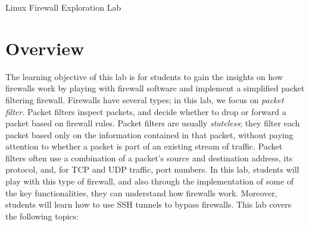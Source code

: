 



\newcommand{\telnet} {\texttt{telnet}\xspace}

\newcommand{\firewallFigs}{./Figs}





\begin{center}
{\LARGE Linux Firewall Exploration Lab}
\end{center}




\section{Overview}

The learning objective of this lab is for students to gain the 
insights on how firewalls work 
by playing with firewall software and implement a simplified 
packet filtering firewall.
Firewalls have several types; in this lab, we focus on
\textit{packet filter}.
Packet filters inspect packets, and decide 
whether to drop or forward a packet based on firewall rules. 
Packet filters are usually {\em stateless}; they filter each packet based 
only on the information contained in that packet, without paying 
attention to whether a packet is part of an existing stream of traffic.
Packet filters often use a combination of a packet's source and 
destination address, its protocol, and, for TCP and UDP traffic, 
port numbers. 
In this lab, students will play with 
this type of firewall, and also through the implementation of some 
of the key functionalities, they can understand how 
firewalls work. Moreover, students will learn how to use SSH tunnels to bypass firewalls. 
This lab covers the following topics:

